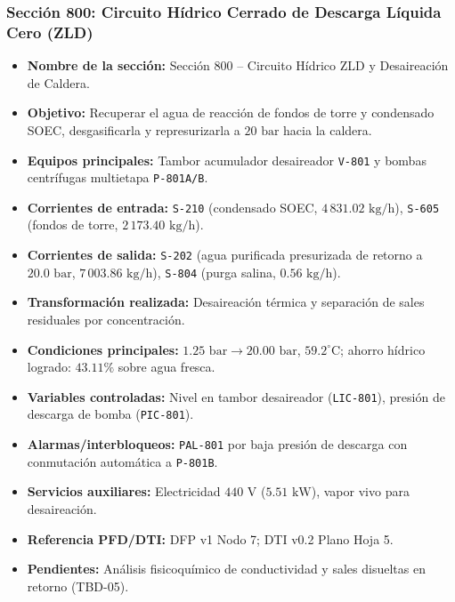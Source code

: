 \documentclass[10pt,letterpaper]{article}
\begin{document}
\subsubsection{Sección 800: Circuito Hídrico Cerrado de Descarga Líquida Cero (ZLD)}
\begin{itemize}
    \item \textbf{Nombre de la sección:} Sección 800 -- Circuito Hídrico ZLD y Desaireación de Caldera.
    \item \textbf{Objetivo:} Recuperar el agua de reacción de fondos de torre y condensado SOEC, desgasificarla y represurizarla a $20\text{ bar}$ hacia la caldera.
    \item \textbf{Equipos principales:} Tambor acumulador desaireador \texttt{V-801} y bombas centrífugas multietapa \texttt{P-801A/B}.
    \item \textbf{Corrientes de entrada:} \texttt{S-210} (condensado SOEC, $4\,831.02\text{ kg/h}$), \texttt{S-605} (fondos de torre, $2\,173.40\text{ kg/h}$).
    \item \textbf{Corrientes de salida:} \texttt{S-202} (agua purificada presurizada de retorno a $20.0\text{ bar}$, $7\,003.86\text{ kg/h}$), \texttt{S-804} (purga salina, $0.56\text{ kg/h}$).
    \item \textbf{Transformación realizada:} Desaireación térmica y separación de sales residuales por concentración.
    \item \textbf{Condiciones principales:} $1.25\text{ bar} \to 20.00\text{ bar}$, $59.2^\circ\text{C}$; ahorro hídrico logrado: $43.11\%$ sobre agua fresca.
    \item \textbf{Variables controladas:} Nivel en tambor desaireador (\texttt{LIC-801}), presión de descarga de bomba (\texttt{PIC-801}).
    \item \textbf{Alarmas/interbloqueos:} \texttt{PAL-801} por baja presión de descarga con conmutación automática a \texttt{P-801B}.
    \item \textbf{Servicios auxiliares:} Electricidad $440\text{ V}$ ($5.51\text{ kW}$), vapor vivo para desaireación.
    \item \textbf{Referencia PFD/DTI:} DFP v1 Nodo 7; DTI v0.2 Plano Hoja 5.
    \item \textbf{Pendientes:} Análisis fisicoquímico de conductividad y sales disueltas en retorno (TBD-05).
\end{itemize}

\newpage
\end{document}

